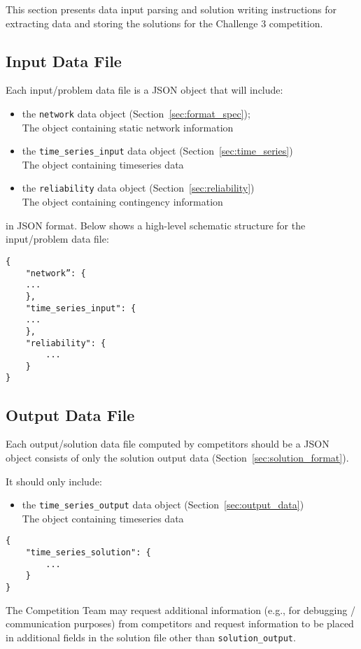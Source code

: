 This section presents data input parsing and solution writing instructions for
extracting data and storing the solutions 
for the Challenge 3 competition.

\subsection{Input Data File}
Each input/problem data file is a JSON object that will include:
\begin{itemize}
    \item the \texttt{network} data object (Section~\ref{sec:format_spec});\\
        The object containing static network information
    \item the \texttt{time\_series\_input} data object (Section~\ref{sec:time_series})\\
        The object containing timeseries data
    \item the \texttt{reliability} data object (Section~\ref{sec:reliability})\\
        The object containing contingency information     
\end{itemize}
in JSON format. Below shows a high-level schematic structure for the input/problem data file:
\begin{verbatim}
{
    "network”: {
    ...
    },
    "time_series_input": {
    ...
    },
    "reliability": {
        ...
    }
}
\end{verbatim}

\subsection{Output Data File}
Each output/solution data file computed by competitors should be a JSON object consists of only 
the solution output data (Section~\ref{sec:solution_format}).

It should only include:
\begin{itemize}
    \item the \texttt{time\_series\_output} data object (Section~\ref{sec:output_data})\\
        The object containing timeseries data
\end{itemize}

\begin{verbatim}
{
    "time_series_solution": {
        ...
    }    
}
\end{verbatim}
The Competition Team may request additional information (e.g., for debugging / communication purposes)
from competitors and request information to be placed in 
additional fields in the solution file other than \texttt{solution\_output}. 

